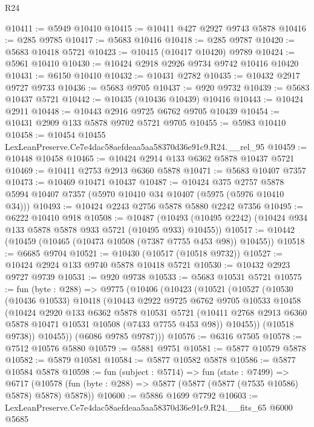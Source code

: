 \begin{lexlean}{R24}
\begin{coremodule}
@10411 := @5949 @10410
@10415 := @10411 @427 @2927 @9743 @5878
@10416 := @285 @9785
@10417 := @5683 @10416
@10418 := @285 @9787
@10420 := @5683 @10418 @5721
@10423 := @10415 (@10417 @10420) @9789
@10424 := @5961 @10410
@10430 := @10424 @2918 @2926 @9734 @9742 @10416 @10420
@10431 := @6150 @10410
@10432 := @10431 @2782
@10435 := @10432 @2917 @9727 @9733
@10436 := @5683 @9705
@10437 := @920 @9732
@10439 := @5683 @10437 @5721
@10442 := @10435 (@10436 @10439) @10416
@10443 := @10424 @2911
@10448 := @10443 @2916 @9725 @6762 @9705 @10439
@10454 := @10431 @2909 @133 @5878 @9702 @5721 @9705
@10455 := @5983 @10410
@10458 := @10454 @10455 LexLeanPreserve.Ce7e4dac58aefdeaa5aa58370d36e91c9.R24.__rel_95
@10459 := @10448 @10458
@10465 := @10424 @2914 @133 @6362 @5878 @10437 @5721
@10469 := @10411 @2753 @2913 @6360 @5878
@10471 := @5683 @10407 @7357
@10473 := @10469 @10471 @10437
@10487 := @10424
    @375
    @2757
    @5878
    @5994
    @10407
    @7357
    (@5970 @10410 @34 @10407 (@5975 (@5976 @10410 @34)))
@10493 := @10424 @2243 @2756 @5878 @5880 @2242 @7356
@10495 := @6222 @10410 @918
@10508 := @10487
    (@10493 (@10495 @2242) (@10424 @934 @133 @5878 @5878 @933 @5721 (@10495 @933) @10455))
@10517 := @10442 (@10459 (@10465 (@10473 @10508 (@7387 @7755 @453 @98)) @10455))
@10518 := @6685 @9704
@10521 := @10430 (@10517 (@10518 @9732))
@10527 := @10424 @2924 @133 @9740 @5878 @10418 @5721
@10530 := @10432 @2923 @9727 @9739
@10531 := @920 @9738
@10533 := @5683 @10531 @5721
@10575 := fun (byte : @288) =>
  @9775
    (@10406
      (@10423
        (@10521
          (@10527
            (@10530
              (@10436 @10533)
              @10418
              (@10443
                @2922
                @9725
                @6762
                @9705
                @10533
                @10458
                (@10424
                  @2920
                  @133
                  @6362
                  @5878
                  @10531
                  @5721
                  (@10411 @2768 @2913 @6360 @5878 @10471 @10531 @10508 (@7433 @7755 @453 @98))
                  @10455))
              (@10518 @9738))
            @10455))
        (@6086 @9785 @9787)))
@10576 := @6316 @7505
@10578 := @7512 @10576 @5880
@10579 := @5881 @9751
@10581 := @5877 @10579 @5878
@10582 := @5879 @10581
@10584 := @5877 @10582 @5878
@10586 := @5877 @10584 @5878
@10598 := fun (subject : @5714) =>
  fun (state : @7499) =>
  @6717 (@10578 (fun (byte : @288) => @5877 (@5877 (@5877 (@7535 @10586) @5878) @5878) @5878))
@10600 := @5886 @1699 @7792
@10603 := LexLeanPreserve.Ce7e4dac58aefdeaa5aa58370d36e91c9.R24.__fits_65 @6000 @5685

\end{coremodule}
\end{lexlean}
